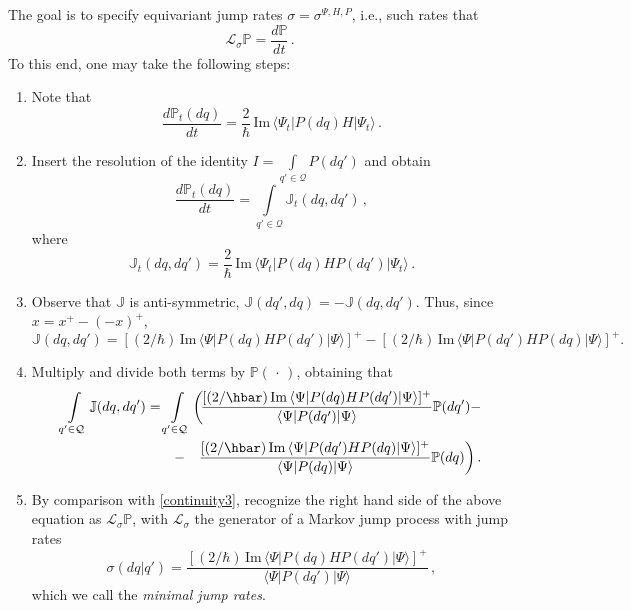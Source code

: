 \documentclass[12pt]{article}
\newcommand{\1}{\mathbf{1}} %
\renewcommand{\Im}{\mathrm{Im}} %
\renewcommand{\sp}[2]{\langle #1 | #2 \rangle} %
\newcommand{\conf}{\mathcal{Q}} %
\newcommand{\measure}{\mathbb{P}} %
\newcommand{\current}{\mathbb{J}}
\newcommand{\generator}{\mathscr{L}} %
\newcommand{\pov}{{P}}%
\begin{document}
The goal is to specify equivariant jump rates $\sigma = \sigma^{\Psi, H,
\pov}$, i.e., such rates that
\begin{equation}\label{equirates}
   \generator_\sigma \measure = \frac{d\measure}{dt} \,.
\end{equation}
To this end, one may take the following steps:

\begin{enumerate}
\item Note that
   \begin{equation}\label{dPdt}
     \frac{d\measure_t(dq)}{dt} = \frac{2}{\hbar} \, \Im \,
     \sp{\Psi_t}{\pov(dq) H| \Psi_t}\,.
   \end{equation}
\item Insert the resolution of the identity $I = 
\int\limits_{q'\in\conf}
   \pov(dq')$ and obtain
   \begin{equation}\label{dPdtJ}
     \frac{d\measure_t(dq)}{dt} =\int\limits_{q'\in\conf}
     \current_t(dq,dq') \,,
   \end{equation}
   where
   \begin{equation}\label{Jdef}
     \current_t(dq,dq') = \frac{2}{\hbar} \,
     \Im \, \sp{\Psi_t}{\pov(dq)H \pov(dq')| \Psi_t} \,.
   \end{equation}
\item Observe that $\current$ is anti-symmetric, $\current(dq',dq) = -
   \current(dq,dq')$.  Thus, since $x = x^+ - (-x)^+$,
   \[
     \current(dq,dq') = \left[(2/\hbar) \, \Im \, \sp{\Psi} {\pov(dq) H
     \pov(dq') |\Psi}\right]^+ - \left[(2/\hbar)\, \Im \, \sp{\Psi}
     {\pov(dq') H \pov(dq) |\Psi}\right]^+ .
   \]
\item Multiply and divide both terms by $\measure(\,\cdot\,)$,
   obtaining that
   \begin{eqnarray*}
     \int\limits_{q'\in\conf} \current(dq,dq') = \int\limits_{q'\in\conf}
     \bigg( \hspace{-3ex} &&
     \frac{[(2/\hbar) \, \Im \, \sp{\Psi} {\pov(dq) H \pov(dq')| 
\Psi}]^+}
     {\sp{\Psi}{\pov(dq')| \Psi}} \measure(dq') -
   \\-&&
     \frac{[(2/\hbar) \, \Im \, \sp{\Psi} {\pov(dq') H \pov(dq)| \Psi}
     ]^+} {\sp{\Psi} {\pov(dq)| \Psi}} \measure(dq) \bigg) \,.
\end{eqnarray*}
\item By comparison with \eqref{continuity3}, recognize the right hand
   side of the above equation as $\generator_\sigma \measure$, with
   $\generator_\sigma$ the generator of a Markov jump process with jump
   rates
   \begin{equation} \label{tranrates}
     \sigma(dq|q')= \frac{[(2/\hbar) \, \Im \, \sp{\Psi} {\pov(dq) H
     \pov(dq')| \Psi}]^+}{\sp{\Psi}{\pov(dq')| \Psi}}\,,
\end{equation}
    which we call the \emph{minimal jump rates}.
\end{enumerate}
\end{document}

